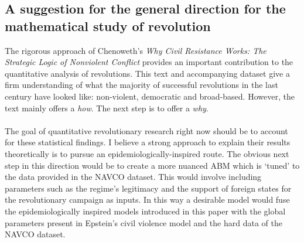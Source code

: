 \subsection{A suggestion for the general direction for the mathematical study of revolution}
The rigorous approach of Chenoweth's \textit{Why Civil Resistance Works: The Strategic Logic of Nonviolent Conflict}\cite{logic-non-violence} provides an important contribution to the quantitative analysis of revolutions. This text and accompanying dataset give a firm understanding of what the majority of successful revolutions in the last century have looked like: non-violent, democratic and broad-based. However, the text mainly offers a \textit{how}. The next step is to offer a \textit{why}.\\
\\
The goal of quantitative revolutionary research right now should be to account for these statistical findings. I believe a strong approach to explain their results theoretically is to pursue an epidemiologically-inspired route. The obvious next step in this direction would be to create a more nuanced ABM which is `tuned' to the data provided in the NAVCO dataset\cite{NAVCO-2.0}. This would involve including parameters such as the regime's legitimacy and the support of foreign states for the revolutionary campaign as inputs. In this way a desirable model would fuse the epidemiologically inspired models introduced in this paper with the global parameters present in Epstein's civil violence model\cite{epstein} and the hard data of the NAVCO dataset.